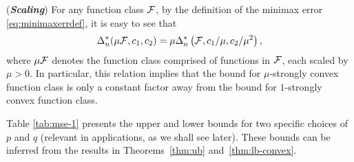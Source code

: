 \begin{remark}(\textbf{\textit{Scaling}})
For any function class $\mathcal{F}$, by the definition of the minimax error \eqref{eq:minimaxerrdef}, it is easy to see that
$$\Delta_n^*(\mu \mathcal{F}, c_1,c_2) = \mu \Delta_n^*\left(\mathcal{F}, c_1/\mu,c_2/\mu^2\right),$$
 where $\mu \mathcal{F}$ denotes the function class comprised of functions in $\mathcal{F}$, each scaled by $\mu>0$. In particular, this relation implies that the bound for $\mu$-strongly convex function class is only a constant factor away from the bound for $1$-strongly convex function class.
\end{remark}

Table \ref{tab:mse-1} presents the upper and lower bounds for two specific choices of $p$ and $q$ (relevant in applications, as we shall see later). These bounds can be inferred from the results in Theorems~\ref{thm:ub} and~\ref{thm:lb-convex}.

